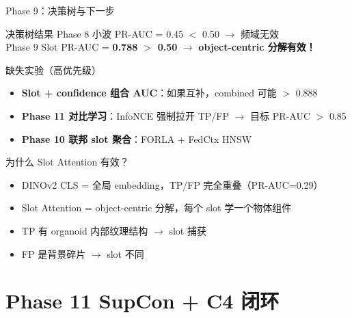 \documentclass[aspectratio=169, 10pt]{beamer}
\begin{document}
\begin{frame}{Phase 9：决策树与下一步}
  \begin{block}{决策树结果}
    Phase 8 小波 PR-AUC = 0.45 $<$ 0.50 $\to$ 频域无效 \\
    Phase 9 Slot PR-AUC = \textbf{0.788 $>$ 0.50} $\to$ \textbf{object-centric 分解有效！}
  \end{block}
  \vspace{0em}
  \begin{alertblock}{缺失实验（高优先级）}
    \begin{itemize}
      \item \textbf{Slot + confidence 组合 AUC}：如果互补，combined 可能 $>$ 0.888
      \item \textbf{Phase 11 对比学习}：InfoNCE 强制拉开 TP/FP $\to$ 目标 PR-AUC $>$ 0.85
      \item \textbf{Phase 10 联邦 slot 聚合}：FORLA + FedCtx HNSW
    \end{itemize}
  \end{alertblock}
  \vspace{0em}
  \begin{block}{为什么 Slot Attention 有效？}
    \begin{itemize}
      \item DINOv2 CLS = 全局 embedding，TP/FP 完全重叠（PR-AUC=0.29）
      \item Slot Attention = object-centric 分解，每个 slot 学一个物体组件
      \item TP 有 organoid 内部纹理结构 $\to$ slot 捕获
      \item FP 是背景碎片 $\to$ slot 不同
    \end{itemize}
  \end{block}
\end{frame}


\section{Phase 11 SupCon + C4 闭环}
\end{document}
